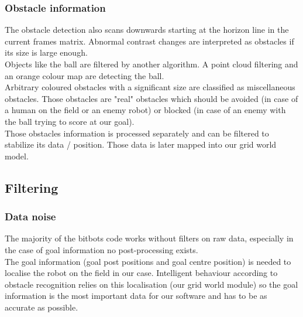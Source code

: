 \documentclass[lnicst,a4paper]{svmultln}
\begin{document}
\subsubsection{Obstacle information}
The obstacle detection also scans downwards starting at the horizon line in the current frames matrix. Abnormal contrast changes are interpreted as obstacles if its size is large enough.
\\
Objects like the ball are filtered by another algorithm. A point cloud filtering and an orange colour map are detecting the ball.
\\
Arbitrary coloured obstacles with a significant size are classified as miscellaneous obstacles. Those obstacles are "real" obstacles which should be avoided (in case of a human on the field or an enemy robot) or blocked (in case of an enemy with the ball trying to score at our goal).
\\
Those obstacles information is processed separately and can be filtered to stabilize its data / position. Those data is later mapped into our grid world model.





\subsection{Filtering}
\label{sec:solutions_filtering}

\subsubsection{Data noise}


The majority of the bitbots code works without filters on raw data, especially in the case of goal information no post-processing exists.
\\
The goal information (goal post positions and goal centre position) is needed to localise the robot on the field in our case. Intelligent behaviour according to obstacle recognition relies on this localisation (our grid world module) so the goal information is the most important data for our software and has to be as accurate as possible.
\end{document}
